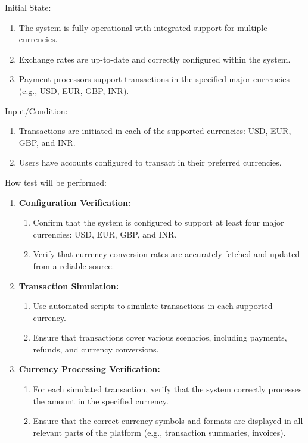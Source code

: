 \documentclass[12pt, titlepage]{article}
\begin{document}
\begin{enumerate}
Initial State:
\begin{enumerate}
    \item The system is fully operational with integrated support for multiple currencies.
    \item Exchange rates are up-to-date and correctly configured within the system.
    \item Payment processors support transactions in the specified major currencies (e.g., USD, EUR, GBP, INR).
\end{enumerate}
Input/Condition:
\begin{enumerate}
    \item Transactions are initiated in each of the supported currencies: USD, EUR, GBP, and INR.
    \item Users have accounts configured to transact in their preferred currencies.
\end{enumerate}
How test will be performed:
\begin{enumerate}
    \item \textbf{Configuration Verification:}
    \begin{enumerate}
        \item Confirm that the system is configured to support at least four major currencies: USD, EUR, GBP, and INR.
        \item Verify that currency conversion rates are accurately fetched and updated from a reliable source.
    \end{enumerate}
    
    \item \textbf{Transaction Simulation:}
    \begin{enumerate}
        \item Use automated scripts to simulate transactions in each supported currency.
        \item Ensure that transactions cover various scenarios, including payments, refunds, and currency conversions.
    \end{enumerate}
    
    \item \textbf{Currency Processing Verification:}
    \begin{enumerate}
        \item For each simulated transaction, verify that the system correctly processes the amount in the specified currency.
        \item Ensure that the correct currency symbols and formats are displayed in all relevant parts of the platform (e.g., transaction summaries, invoices).
    \end{enumerate}
    

\end{enumerate}
\end{enumerate}
\end{document}

